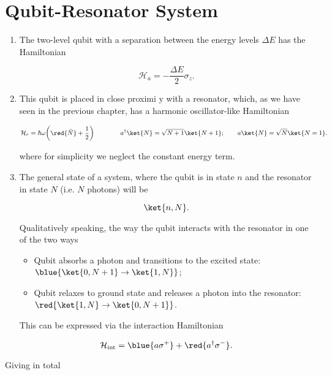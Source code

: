 
\section{Qubit-Resonator System \cite{cqeResonator}}
\begin{enumerate}
\item The two-level qubit with a separation between the energy levels $ \Delta E $ has the Hamiltonian

\begin{equation}
  \mathcal{H}_{a}= -\frac{\Delta E}{2}\sigma_z.
  \label{qrA}
\end{equation}

\item This qubit is placed in close proximi y with a resonator, which, as we have seen in the previous chapter, has a harmonic
  oscillator-like Hamiltonian

\begin{equation}
  \mathcal{H}_{r}={\hbar\omega}\bigg(\red{\hat{N}}+\frac{1}{2}\bigg)\qquad \qquad a^{\dagger}\ket{N}=\sqrt{N+1}\ket{N+1}; \qquad a\ket{N}=\sqrt{N}\ket{N=1}.
  \label{qrR}
\end{equation}

\noindent where for simplicity we neglect the constant energy term.

\item The general state of a system, where the qubit is in state $ n $ and the resonator in state $ N $ (i.e. $ N $ photons) will
  be

\begin{equation}
  \ket{n,N}.
\end{equation}

\noindent Qualitatively speaking, the way the qubit interacts with the resonator in one of the two ways

\begin{itemize}
\item Qubit absorbs a photon and transitions to the excited state: $ \blue{\ket{0,N+1} \rightarrow \ket{1,N}} $;
\item Qubit relaxes to ground state and releases a photon into the resonator: $ \red{\ket{1,N} \rightarrow \ket{0,N+1}} $.
\end{itemize}

This can be expressed via the interaction Hamiltonian

\begin{equation}
  \mathcal{H}_{\text{int}}=\blue{a\sigma^+}+\red{a^{\dagger}\sigma^-}.
  \label{qrInt}
\end{equation}
\end{enumerate}
Giving in total \iframe{\LARGE
  \[ \mathcal{H} =\blue{-\frac{\Delta E}{2}\sigma_z}+\blue{{\hbar\omega_r}a^\dagger a} + \red{g_0\bigg({a\sigma^+}+{a^{\dagger}\sigma^-}\bigg)},
  \]}

